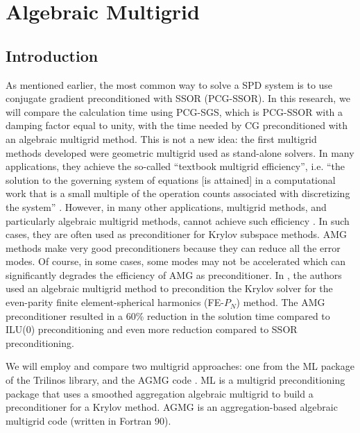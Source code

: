 \section{Algebraic Multigrid} \label{sec_amg}
\subsection{Introduction}
As mentioned earlier, the most common way to solve a SPD system is to use
conjugate gradient preconditioned with SSOR (PCG-SSOR). In this research, we
will compare the calculation time using PCG-SGS, which is PCG-SSOR with a
damping factor equal to unity, with the time needed by CG 
preconditioned with an algebraic multigrid method. This is not a new idea: the 
first multigrid methods developed were geometric multigrid used as stand-alone 
solvers. In many applications, they achieve the so-called ``textbook multigrid
efficiency'', i.e. ``the solution to the governing system of equations [is
attained] in a computational work that is a small multiple of the operation
counts associated with discretizing the system'' \cite{textbook_eff}. However, 
in many other applications, multigrid methods, and particularly algebraic 
multigrid methods, cannot achieve such efficiency \cite{k_cycle}. In
such cases, they are often used as preconditioner for Krylov subspace methods. 
AMG methods make very good preconditioners because they can reduce all the error
modes. Of course, in some cases, some modes may not be accelerated which can 
significantly degrades the efficiency of AMG as preconditioner. In \cite{amg_pn}, 
the authors used an 
algebraic multigrid method to precondition the Krylov solver for the even-parity 
finite element-spherical harmonics (FE-$P_N$) method. The AMG preconditioner 
resulted in a 60\% reduction in the solution time compared to ILU(0) 
preconditioning and even more reduction compared to SSOR preconditioning. 

We will employ and compare two multigrid approaches: one from the ML package
\cite{ml_guide} of the Trilinos library, and the AGMG code \cite{agmg_guide}. 
ML is a multigrid preconditioning package that uses a smoothed aggregation 
algebraic multigrid to build a preconditioner for a Krylov method. AGMG is an 
aggregation-based algebraic multigrid code (written in Fortran 90).


